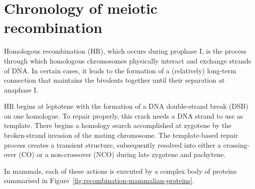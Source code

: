 %
%
%
%







\section{Chronology of meiotic recombination}

Homologous recombination (HR), which occurs during prophase I, is the process through which homologous chromosomes physically interact and exchange strands of DNA\@. 
In certain cases, it leads to the formation of a (relatively) long-term connection that maintains the bivalents together until their separation at anaphase I\@.

HR begins at leptotene with the formation of a DNA double-strand break (DSB) on one homologue. 
To repair properly, this crack needs a DNA strand to use as template. There begins a homology search accomplished at zygotene by the broken-strand invasion of the mating chromosome.
The template-based repair process creates a transient structure, subsequently resolved into either a crossing-over (CO) or a non-crossover (NCO) during late zygotene and pachytene.

In mammals, each of these actions is executed by a complex body of proteins summarised in Figure~\ref{fig:recombination-mammalian-proteins}. 




